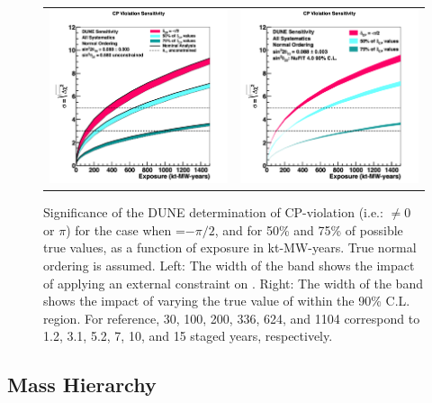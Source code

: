 \begin{figure}[h!]
    \centering
    \begin{tabular}{cc}
		\includegraphics[width=0.475\linewidth]{graphics/cpv_exp_varyconstr_nh_2019_v4.png} &
		\includegraphics[width=0.475\linewidth]{graphics/cpv_exp_varyth23_nh_2019_v4.png}
    \end{tabular}
	\caption[Significance of the DUNE determination of CP-violation as a function of exposure]{Significance of the DUNE determination of CP-violation (i.e.: \deltacp $\neq 0$ or $\pi$) for the case when \deltacp=$-\pi/2$, and for 50\% and 75\% of possible true \deltacp values, as a function of exposure in kt-MW-years. True normal ordering is assumed. Left: The width of the band shows the impact of applying an external constraint on . Right: The width of the band shows the impact of varying the true value of  within the  90\% C.L. region.
For reference, 30, 100, 200, 336, 624, and \SI{1104}{\ktMWyr} correspond to 1.2, 3.1, 5.2, 7, 10, and 15 staged years, respectively.
}
    \label{fig:cpv_exposure}
\end{figure}

\subsection{Mass Hierarchy}
\label{sec:physics-lbnosc-mh}



